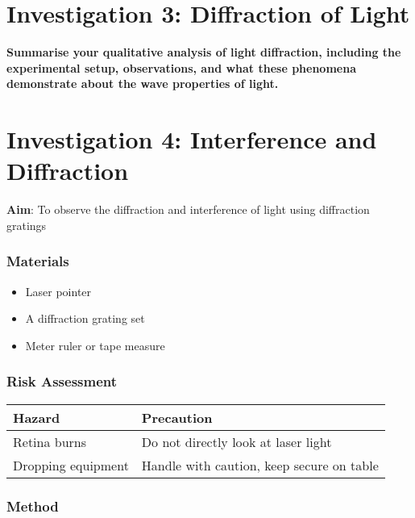 \documentclass{report}
\begin{document}
\newpage

	\section{Investigation 3: Diffraction of Light}
	
		\textbf{Summarise your qualitative analysis of light diffraction, including the experimental setup, observations, and what these phenomena demonstrate about the wave properties of light.}

\newpage

	\section{Investigation 4: Interference and Diffraction}

		\textbf{Aim}: To observe the diffraction and interference of light using diffraction gratings
		\subsubsection{Materials}

			\begin{itemize}
				\item Laser pointer
				\item A diffraction grating set
				\item Meter ruler or tape measure
			\end{itemize}

		\subsubsection{Risk Assessment}
		
			\begin{table}[H]
				\centering
				\begin{tabular}{p{7cm}|p{7cm}}
					\textbf{Hazard} & \textbf{Precaution} \\ \hline
					Retina burns & Do not directly look at laser light \\
					Dropping equipment & Handle with caution, keep secure on table

				\end{tabular}
			\end{table}
		
		\subsubsection{Method}
\end{document}
